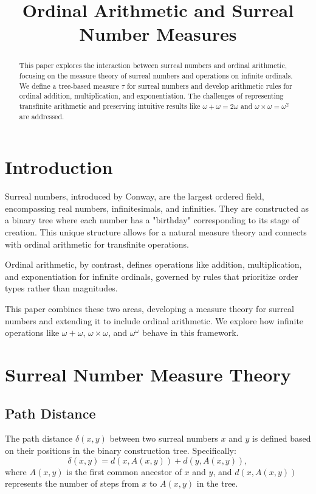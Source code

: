 \documentclass[12pt]{article}
\title{Ordinal Arithmetic and Surreal Number Measures}
\author{}
\date{}
\begin{document}
\maketitle

\begin{abstract}
This paper explores the interaction between surreal numbers and ordinal arithmetic, focusing on the measure theory of surreal numbers and operations on infinite ordinals. We define a tree-based measure \( \tau \) for surreal numbers and develop arithmetic rules for ordinal addition, multiplication, and exponentiation. The challenges of representing transfinite arithmetic and preserving intuitive results like \( \omega + \omega = 2\omega \) and \( \omega \times \omega = \omega^2 \) are addressed.
\end{abstract}

\section{Introduction}
Surreal numbers, introduced by Conway, are the largest ordered field, encompassing real numbers, infinitesimals, and infinities. They are constructed as a binary tree where each number has a "birthday" corresponding to its stage of creation. This unique structure allows for a natural measure theory and connects with ordinal arithmetic for transfinite operations.

Ordinal arithmetic, by contrast, defines operations like addition, multiplication, and exponentiation for infinite ordinals, governed by rules that prioritize order types rather than magnitudes.

This paper combines these two areas, developing a measure theory for surreal numbers and extending it to include ordinal arithmetic. We explore how infinite operations like \( \omega + \omega \), \( \omega \times \omega \), and \( \omega^\omega \) behave in this framework.

\section{Surreal Number Measure Theory}

\subsection{Path Distance}
The path distance \( \delta(x, y) \) between two surreal numbers \( x \) and \( y \) is defined based on their positions in the binary construction tree. Specifically:
\[
\delta(x, y) = d(x, A(x, y)) + d(y, A(x, y)),
\]
where \( A(x, y) \) is the first common ancestor of \( x \) and \( y \), and \( d(x, A(x, y)) \) represents the number of steps from \( x \) to \( A(x, y) \) in the tree.
\end{document}
